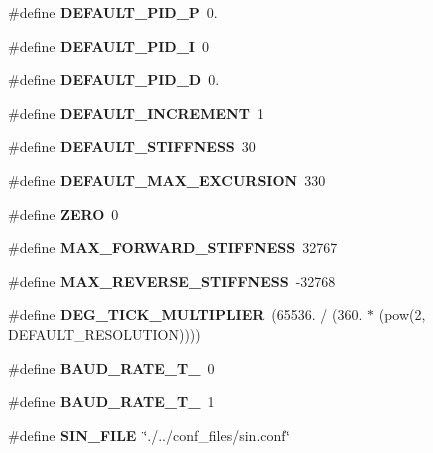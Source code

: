 \begin{DoxyCompactItemize}
\mbox{\label{definitions_8h_a4c6daad09923a0ab3ed52ebb1c0b8cb8}} 
\#define {\bfseries D\+E\+F\+A\+U\+L\+T\+\_\+\+P\+I\+D\+\_\+P}~0.
\item 
\mbox{\label{definitions_8h_a6f7a63a5d40ee41381abe79b78993567}} 
\#define {\bfseries D\+E\+F\+A\+U\+L\+T\+\_\+\+P\+I\+D\+\_\+I}~0
\item 
\mbox{\label{definitions_8h_ab285c4cd42477c9669f9981d03572d2f}} 
\#define {\bfseries D\+E\+F\+A\+U\+L\+T\+\_\+\+P\+I\+D\+\_\+D}~0.
\item 
\mbox{\label{definitions_8h_a4956377066b3b3074de9c79d7e1d8967}} 
\#define {\bfseries D\+E\+F\+A\+U\+L\+T\+\_\+\+I\+N\+C\+R\+E\+M\+E\+NT}~1
\item 
\mbox{\label{definitions_8h_a8c5790f774337ec087041124dda03ed4}} 
\#define {\bfseries D\+E\+F\+A\+U\+L\+T\+\_\+\+S\+T\+I\+F\+F\+N\+E\+SS}~30
\item 
\mbox{\label{definitions_8h_a92f641bf6a2b5f3e0277d62d29158bff}} 
\#define {\bfseries D\+E\+F\+A\+U\+L\+T\+\_\+\+M\+A\+X\+\_\+\+E\+X\+C\+U\+R\+S\+I\+ON}~330
\item 
\mbox{\label{definitions_8h_ac328e551bde3d39b6d7b8cc9e048d941}} 
\#define {\bfseries Z\+E\+RO}~0
\item 
\mbox{\label{definitions_8h_a2719be2b85fcfd6fd26291a9a7775ea7}} 
\#define {\bfseries M\+A\+X\+\_\+\+F\+O\+R\+W\+A\+R\+D\+\_\+\+S\+T\+I\+F\+F\+N\+E\+SS}~32767
\item 
\mbox{\label{definitions_8h_ad91fa28a852c573709249b16fca30d23}} 
\#define {\bfseries M\+A\+X\+\_\+\+R\+E\+V\+E\+R\+S\+E\+\_\+\+S\+T\+I\+F\+F\+N\+E\+SS}~-\/32768
\item 
\mbox{\label{definitions_8h_adc098850cdde5fbe8e5f4fe910f9ce27}} 
\#define {\bfseries D\+E\+G\+\_\+\+T\+I\+C\+K\+\_\+\+M\+U\+L\+T\+I\+P\+L\+I\+ER}~(65536. / (360. $\ast$ (pow(2, D\+E\+F\+A\+U\+L\+T\+\_\+\+R\+E\+S\+O\+L\+U\+T\+I\+ON))))
\item 
\mbox{\label{definitions_8h_a44483e681594d0e510fd59c2b4b09ed9}} 
\#define {\bfseries B\+A\+U\+D\+\_\+\+R\+A\+T\+E\+\_\+\+T\+\_}~0
\item 
\mbox{\label{definitions_8h_ad2c3e3edb0886633d686996e2f8c48e6}} 
\#define {\bfseries B\+A\+U\+D\+\_\+\+R\+A\+T\+E\+\_\+\+T\+\_}~1
\item 
\mbox{\label{definitions_8h_a342ce09900d5e0dc2b6adb9afe5f1778}} 
\#define {\bfseries S\+I\+N\+\_\+\+F\+I\+LE}~\char`\"{}./../conf\+\_\+files/sin.\+conf\char`\"{}
\item 
\mbox{\label{definitions_8h_aaf3958c9ffdb0121b3ae603509e15d44}} 

\end{DoxyCompactItemize}
